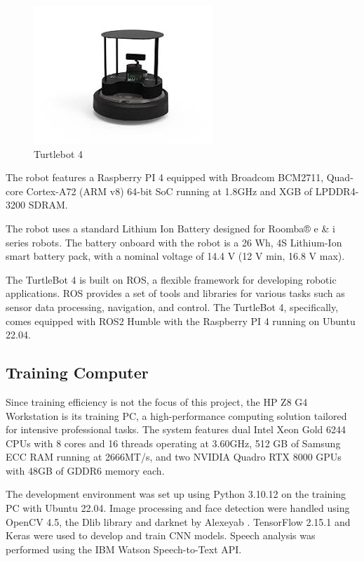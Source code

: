 \begin{figure}[!htb]
    \centering{}
    \includegraphics[scale=0.5]{tb4.jpg}
    \caption{Turtlebot 4}
    \label{figure:tb4}
\end{figure}


The robot features a Raspberry PI 4 equipped with Broadcom BCM2711, Quad-core Cortex-A72 (ARM v8) 64-bit SoC running at 1.8GHz and XGB of LPDDR4-3200 SDRAM.

The robot uses a standard Lithium Ion Battery designed for Roomba® e \& i series robots. The battery onboard with the robot is a 26 Wh, 4S Lithium-Ion smart battery pack, with a nominal voltage of 14.4 V (12 V min, 16.8 V max).

The TurtleBot 4 is built on ROS, a flexible framework for developing robotic applications. ROS provides a set of tools and libraries for various tasks such as sensor data processing, navigation, and control. The TurtleBot 4, specifically, comes equipped with ROS2 Humble with the Raspberry PI 4 running on Ubuntu 22.04.

\subsection{Training Computer}

Since training efficiency is not the focus of this project, the HP Z8 G4 Workstation is its training PC, a high-performance computing solution tailored for intensive professional tasks. The system features dual Intel Xeon Gold 6244 CPUs with 8 cores and 16 threads operating at 3.60GHz, 512 GB of Samsung ECC RAM running at 2666MT/s, and two NVIDIA Quadro RTX 8000 GPUs with 48GB of GDDR6 memory each.

The development environment was set up using Python 3.10.12 on the training PC with Ubuntu 22.04. Image processing and face detection were handled using OpenCV 4.5, the Dlib library and darknet by Alexeyab \cite{Alexey_2021-lf}. TensorFlow 2.15.1 and Keras were used to develop and train CNN models. Speech analysis was performed using the IBM Watson Speech-to-Text API.

